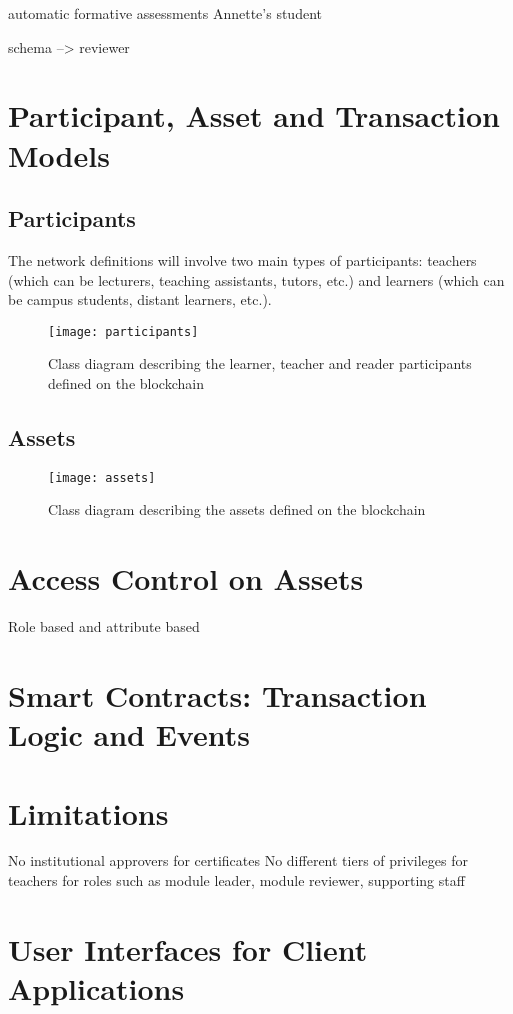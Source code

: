 automatic formative assessments Annette's student

schema --> reviewer

\section{Participant, Asset and Transaction Models}

\subsection{Participants}

The network definitions will involve two main types of participants: teachers (which can be lecturers, 
teaching assistants, tutors, etc.) and learners (which can be campus students, distant learners, etc.).

\begin{figure}[!ht] 
    \centering    
    \texttt{[image: participants]}
    \caption[Participants Class Diagram]
        {Class diagram describing the learner, teacher and reader participants defined on the blockchain} 
    \label{fig:participants}
\end{figure}

\subsection{Assets}
\begin{figure}[!ht] 
    \centering    
    \texttt{[image: assets]}
    \caption[Assets Class Diagram]
        {Class diagram describing the assets defined on the blockchain} 
    \label{fig:assets}
\end{figure}

\section{Access Control on Assets}
Role based and attribute based

\section{Smart Contracts: Transaction Logic and Events}

\section{Limitations}
No institutional approvers for certificates
No different tiers of privileges for teachers for roles such as module leader, module reviewer, supporting staff

\section{User Interfaces for Client Applications}
